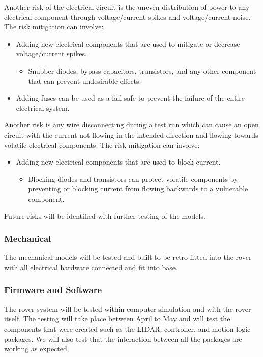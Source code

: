 \documentclass[a4paper, 10pt]{article}
\begin{document}
Another risk of the electrical circuit is the uneven distribution of power to any electrical component through voltage/current spikes and voltage/current noise. The risk mitigation can involve:

\begin{itemize}
\item
Adding new electrical components that are used to mitigate or decrease voltage/current spikes.

	\begin{itemize}
		\item
		Snubber diodes, bypass capacitors, transistors, and any other component that can prevent undesirable effects. 
	\end{itemize}
	
\item
Adding fuses can be used as a fail-safe to prevent the failure of the entire electrical system.
\end{itemize}


Another risk is any wire disconnecting during a test run which can cause an open circuit with the current not flowing in the intended direction and flowing towards volatile electrical components. The risk mitigation can involve:

\begin{itemize}
\item
Adding new electrical components that are used to block current.

	\begin{itemize}
		\item
		Blocking diodes and transistors can protect volatile components by preventing or blocking current from flowing backwards to a vulnerable component. 
	\end{itemize}
\end{itemize}

Future risks will be identified with further testing of the models.

		\subsubsection{Mechanical}
		The mechanical models will be tested and built to be retro-fitted into the rover with all electrical hardware connected and fit into base.
		
		\subsubsection{Firmware and Software}
		The rover system will be tested within computer simulation and with the rover itself. The testing will take place between April to May and will test the components that were created such as the LIDAR, controller, and motion logic packages. We will also test that the interaction between all the packages are working as expected. 
		
\end{document}
